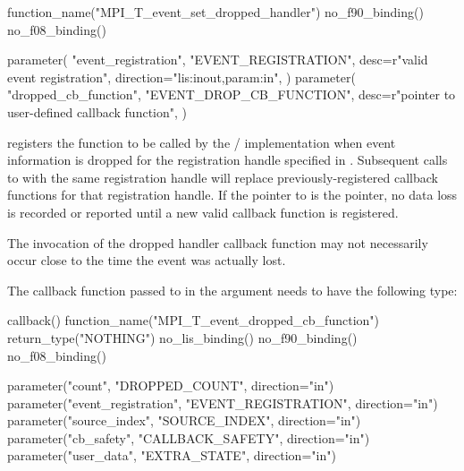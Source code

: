 \begin{mpi-binding}
    function_name("MPI_T_event_set_dropped_handler")
    no_f90_binding()
    no_f08_binding()

    parameter(
        "event_registration",
        "EVENT_REGISTRATION",
        desc=r"valid event registration",
        direction="lis:inout,param:in",
    )
    parameter(
        "dropped_cb_function",
        "EVENT_DROP_CB_FUNCTION",
        desc=r"pointer to user-defined callback function",
    )
\end{mpi-binding}

 registers the function 
 to be called by the \MPI/
implementation when event information is dropped for the registration handle
specified in . 
Subsequent calls to  
with the same registration handle will replace previously-registered callback functions 
for that registration handle.
If the pointer to
 is the  pointer,
no data loss is recorded or reported until a new valid callback function is registered.


\begin{users}
    The invocation of the dropped handler callback function may not necessarily occur 
    close to the time the event was actually lost.
\end{users}


The callback function passed to  in
the argument  needs to have the following
type:

\begin{mpi-binding}
    callback()
    function_name("MPI_T_event_dropped_cb_function")
    return_type("NOTHING")
    no_lis_binding()
    no_f90_binding()
    no_f08_binding()

    parameter("count", "DROPPED_COUNT", direction="in")
    parameter("event_registration", "EVENT_REGISTRATION", direction="in")
    parameter("source_index", "SOURCE_INDEX", direction="in")
    parameter("cb_safety", "CALLBACK_SAFETY", direction="in")
    parameter("user_data", "EXTRA_STATE", direction="in")
\end{mpi-binding}

